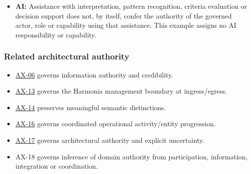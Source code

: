 \begin{itemize}
\item 
\textbf{AI:} Assistance with interpretation, pattern recognition, criteria evaluation or decision support does not, by itself, confer the authority of the governed actor, role or capability using that assistance. This example assigns no AI responsibility or capability.



\end{itemize}
\label{rad:axioms:959}
\subsubsection*{Related architectural authority}
\label{rad:axioms:961}

\begin{itemize}

\item 
\href{https://github.com/fhirfactory/harmonia/blob/98410db60155198a75f74c79d98060070209faa1/docs/markdown/governance/architectural-axioms.md\#ax-06}{AX-06} governs information authority and credibility.



\item 
\href{https://github.com/fhirfactory/harmonia/blob/98410db60155198a75f74c79d98060070209faa1/docs/markdown/governance/architectural-axioms.md\#ax-13}{AX-13} governs the Harmonia management boundary at ingress/\allowbreak{}egress.



\item 
\href{https://github.com/fhirfactory/harmonia/blob/98410db60155198a75f74c79d98060070209faa1/docs/markdown/governance/architectural-axioms.md\#ax-14}{AX-14} preserves meaningful semantic distinctions.



\item 
\href{https://github.com/fhirfactory/harmonia/blob/98410db60155198a75f74c79d98060070209faa1/docs/markdown/governance/architectural-axioms.md\#ax-16}{AX-16} governs coordinated operational activity/\allowbreak{}entity progression.



\item 
\href{https://github.com/fhirfactory/harmonia/blob/98410db60155198a75f74c79d98060070209faa1/docs/markdown/governance/architectural-axioms.md\#ax-17}{AX-17} governs architectural authority and explicit uncertainty.



\item 
AX-18 governs inference of domain authority from participation, information, integration or coordination.



\end{itemize}
